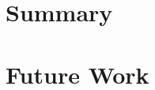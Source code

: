 \cleardoublepage
\label{chap:conclusion}

\section{Summary} \label{chap:conclusion:summary}

\section{Future Work} \label{chap:conclusion:future-work}
